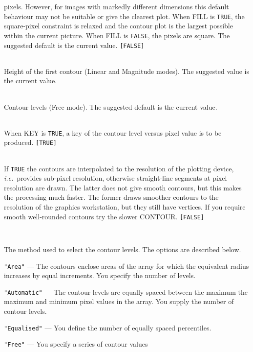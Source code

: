 \documentclass[twoside,11pt]{article}
\newcommand{\sstsubsection}[1]{ \item[{#1}] \mbox{} \\}
\newcommand{\sstsubsection}[1]{\item[{#1}]}
\begin{document}
{{{         pixels.  However, for images with markedly different
         dimensions this default behaviour may not be suitable or give
         the clearest plot.  When FILL is {\tt TRUE}, the square-pixel
         constraint is relaxed and the contour plot is the largest
         possible within the current picture.  When FILL is {\tt FALSE}, the
         pixels are square.  The suggested default is the current
         value.  {\tt [FALSE]}
      }
      \sstsubsection{
         FIRSTCNT = \_REAL (Read)
      }{
         Height of the first contour (Linear and Magnitude modes).
         The suggested value is the current value.
      }
      \sstsubsection{
         HEIGHTS() = \_REAL (Read)
      }{
         Contour levels (Free mode).  The suggested default is the
         current value.
      }
      \sstsubsection{
         KEY = \_LOGICAL (Read)
      }{
         When KEY is {\tt TRUE}, a key of the contour level versus
         pixel value is to be produced. {\tt [TRUE]}
      }
      \sstsubsection{
         MAXRES = \_LOGICAL (Read)
      }{
         If {\tt TRUE} the contours are interpolated to the resolution of the
         plotting device, {\it i.e.}\ provides sub-pixel resolution, otherwise
         straight-line segments at pixel resolution are drawn.  The
         latter does not give smooth contours, but this makes the
         processing much faster.  The former draws smoother contours to
         the resolution of the graphics workstation, but they still
         have vertices.  If you require smooth well-rounded contours try
         the slower CONTOUR. {\tt [FALSE]}
      }
      \sstsubsection{
         MODE = LITERAL (Read)
      }{
         The method used to select the contour levels.  The options are
         described below.
         \begin{description}
         \item {\tt "Area"} --- The contours enclose areas of the array for
                         which the equivalent radius increases by equal
                         increments.  You specify the number of levels.
         \item {\tt "Automatic"} --- The contour levels are equally spaced between the maximum
                        the maximum and minimum pixel values in the
                        array.  You supply the number of contour levels.
         \item {\tt "Equalised"} --- You define the number of equally spaced
                          percentiles.
         \item {\tt "Free"} --- You specify a series of contour values

\end{description}}}}
\end{document}
